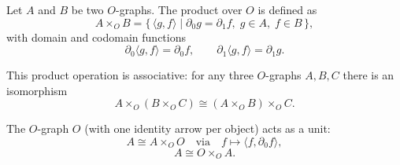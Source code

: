 Let $A$ and $B$ be two $O$-graphs. The product over $O$ is defined as
$$A \times_O B = \{\, \langle g, f \rangle \mid \partial_0 g = \partial_1 f,\; g \in A,\; f \in B \,\},$$
with domain and codomain functions
$$\partial_0 \langle g, f \rangle = \partial_0 f, \qquad \partial_1 \langle g, f \rangle = \partial_1 g.$$

This product operation is associative: for any three $O$-graphs $A, B, C$ there is an isomorphism
$$A \times_O (B \times_O C) \cong (A \times_O B) \times_O C.$$

The $O$-graph $O$ (with one identity arrow per object) acts as a unit:
$$A \cong A \times_O O \quad \text{via} \quad f \mapsto \langle f, \partial_0 f \rangle,$$
$$A \cong O \times_O A.$$
